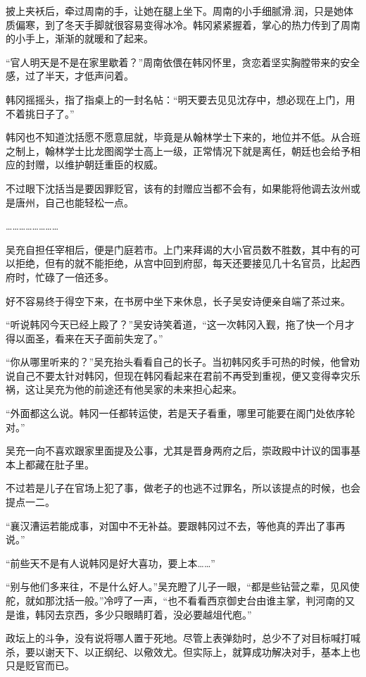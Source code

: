 披上夹袄后，牵过周南的手，让她在腿上坐下。周南的小手细腻滑.润，只是她体质偏寒，到了冬天手脚就很容易变得冰冷。韩冈紧紧握着，掌心的热力传到了周南的小手上，渐渐的就暖和了起来。

“官人明天是不是在家里歇着？”周南依偎在韩冈怀里，贪恋着坚实胸膛带来的安全感，过了半天，才低声问着。

韩冈摇摇头，指了指桌上的一封名帖：“明天要去见见沈存中，想必现在上门，用不着挑日子了。”

韩冈也不知道沈括愿不愿意屈就，毕竟是从翰林学士下来的，地位并不低。从合班之制上，翰林学士比龙图阁学士高上一级，正常情况下就是离任，朝廷也会给予相应的封赠，以维护朝廷重臣的权威。

不过眼下沈括当是要因罪贬官，该有的封赠应当都不会有，如果能将他调去汝州或是唐州，自己也能轻松一点。

……………………

吴充自担任宰相后，便是门庭若市。上门来拜谒的大小官员数不胜数，其中有的可以拒绝，但有的就不能拒绝，从宫中回到府邸，每天还要接见几十名官员，比起西府时，忙碌了一倍还多。

好不容易终于得空下来，在书房中坐下来休息，长子吴安诗便亲自端了茶过来。

“听说韩冈今天已经上殿了？”吴安诗笑着道，“这一次韩冈入觐，拖了快一个月才得以面圣，看来在天子面前失宠了。”

“你从哪里听来的？”吴充抬头看看自己的长子。当初韩冈炙手可热的时候，他曾劝说自己不要太针对韩冈，但现在韩冈看起来在君前不再受到重视，便又变得幸灾乐祸，这让吴充为他的前途还有他吴家的未来担心起来。

“外面都这么说。韩冈一任都转运使，若是天子看重，哪里可能要在阁门处依序轮对。”

吴充一向不喜欢跟家里面提及公事，尤其是晋身两府之后，崇政殿中计议的国事基本上都藏在肚子里。

不过若是儿子在官场上犯了事，做老子的也逃不过罪名，所以该提点的时候，也会提点一二。

“襄汉漕运若能成事，对国中不无补益。要跟韩冈过不去，等他真的弄出了事再说。”

“前些天不是有人说韩冈是好大喜功，要上本……”

“别与他们多来往，不是什么好人。”吴充瞪了儿子一眼，“都是些钻营之辈，见风使舵，就如那沈括一般。”冷哼了一声，“也不看看西京御史台由谁主掌，判河南的又是谁，韩冈去京西，多少只眼睛盯着，没必要越俎代庖。”

政坛上的斗争，没有说将哪人置于死地。尽管上表弹劾时，总少不了对目标喊打喊杀，要以谢天下、以正纲纪、以儆效尤。但实际上，就算成功解决对手，基本上也只是贬官而已。

